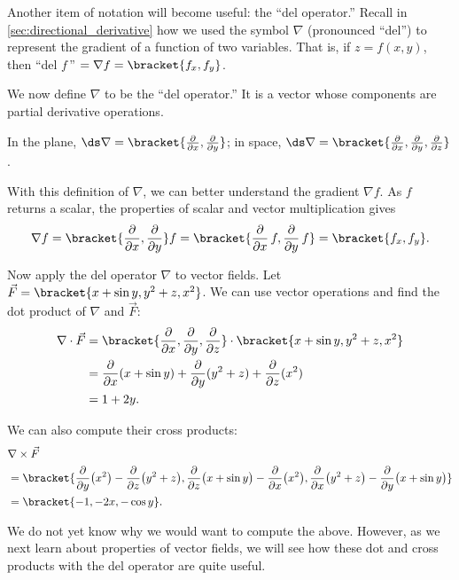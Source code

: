 Another item of notation will become useful: the ``del operator.'' Recall in \autoref{sec:directional_derivative} how we used the symbol $\nabla$ (pronounced ``del'') to represent the gradient of a function of two variables. That is, if $z = f(x,y)$, then ``del $f$\,'' $= \nabla f =\bracket{f_x, f_y}$. 

We now define $\nabla$ to be the ``del operator.'' It is a vector whose components are partial derivative operations. 

In the plane, $\ds\nabla =\bracket{\frac{\partial}{\partial x}, \frac{\partial}{\partial y}}$; in space, $\ds\nabla =\bracket{\frac{\partial}{\partial x}, \frac{\partial}{\partial y},\frac{\partial}{\partial z}}$. 

With this definition of $\nabla$, we can better understand the gradient $\nabla f$. As $f$ returns a scalar, the properties of scalar and vector multiplication gives
\[
\nabla f
=\bracket{\frac{\partial}{\partial x}, \frac{\partial}{\partial y}}f
=\bracket{\frac{\partial}{\partial x}\,f, \frac{\partial}{\partial y}\,f}
=\bracket{f_x, f_y}.
\]

Now apply the del operator $\nabla$ to vector fields. Let $\vec F =\bracket{x+\sin y,y^2+z,x^2}$. We can use vector operations and find the dot product of $\nabla$ and $\vec F$:
\begin{align*}
	\nabla \cdot \vec F
	&=\bracket{\frac{\partial}{\partial x}, \frac{\partial}{\partial y},\frac{\partial}{\partial z}}\cdot \bracket{x+\sin y,y^2+z,x^2}\\
	&= \frac{\partial}{\partial x}(x+\sin y)+ \frac{\partial}{\partial y}(y^2+z) + \frac{\partial}{\partial z}(x^2) \\
	&=1+2y.
\end{align*}

We can also compute their cross products:\small
\begin{align*}
	&\nabla\times \vec F\\
	&= {\bracket{\frac{\partial}{\partial y}\bigl(x^2\bigr)-\frac{\partial}{\partial z}\bigl(y^2+z\bigr),\frac{\partial}{\partial z}\bigl(x+\sin y\bigr)-\frac{\partial}{\partial x}\bigl(x^2\bigr),\frac{\partial}{\partial x}\bigl(y^2+z\bigr)-\frac{\partial}{\partial y}\bigl(x+\sin y\bigr)}}\\
	&=\bracket{-1,-2x,-\cos y}.
\end{align*}\normalsize

We do not yet know why we would want to compute the above. However, as we next learn about properties of vector fields, we will see how these dot and cross products with the del operator are quite useful.

